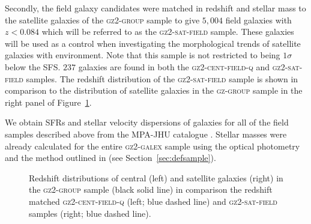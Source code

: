 Secondly, the field galaxy candidates were matched in redshift and stellar mass to the satellite galaxies of the \textsc{gz2-group} sample to give $5, 004$ field galaxies with $z < 0.084$ which will be referred to as the \textsc{gz2-sat-field} sample. These galaxies will be used as a control when investigating the morphological trends of satellite galaxies with environment. Note that this sample is not restricted to being $1\sigma$ below the SFS. $237$ galaxies are found in both the \textsc{gz2-cent-field-q} and \textsc{gz2-sat-field} samples. The redshift distribution of the \textsc{gz2-sat-field} sample is shown in comparison to the distribution of satellite galaxies in the \textsc{gz-group} sample in the right panel of Figure~\ref{fig:zcompare}.

We obtain SFRs and stellar velocity dispersions of galaxies for all of the field samples described above from the MPA-JHU catalogue \citep{kauffmann03, brinchmann04}. Stellar masses were already calculated for the entire \textsc{gz2-galex} sample using the optical photometry and the method outlined in \citet{Baldry06} (see Section~\ref{sec:defsample}).

\begin{figure}
\caption[Redshift distribution of galaxies in the \textsc{gz2-group} sample]{Redshift distributions of central (left) and satellite galaxies (right) in the \textsc{gz2-group} sample (black solid line) in comparison the redshift matched \textsc{gz2-cent-field-q} (left; blue dashed line) and \textsc{gz2-sat-field} samples (right; blue dashed line).}
\label{fig:zcompare}
\end{figure}

